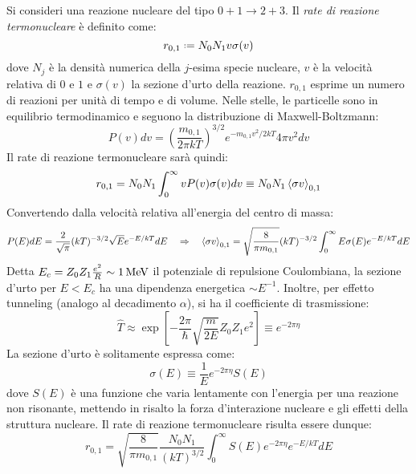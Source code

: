 Si consideri una reazione nucleare del tipo $ 0 + 1 \rightarrow 2 + 3 $. Il \textit{rate di reazione termonucleare} è definito come:
\begin{equation}
	r_{0,1} \defeq N_0 N_1 v \sigma(v)
	\label{eq:13.1}
\end{equation}
dove $ N_j $ è la densità numerica della $ j $-esima specie nucleare, $ v $ è la velocità relativa di $ 0 $ e $ 1 $ e $ \sigma(v) $ la sezione d'urto della reazione. $ r_{0,1} $ esprime un numero di reazioni per unità di tempo e di volume. Nelle stelle, le particelle sono in equilibrio termodinamico e seguono la distribuzione di Maxwell-Boltzmann:
\begin{equation}
	P(v) dv = \left( \frac{m_{0,1}}{2\pi k T} \right)^{3/2} e^{-m_{0,1} v^2 / 2kT} 4\pi v^2 dv
	\label{eq:13.2}
\end{equation}
Il rate di reazione termonucleare sarà quindi:
\begin{equation}
	r_{0,1} = N_0 N_1 \int_0^\infty v P(v) \sigma(v) dv \equiv N_0 N_1 \braket{\sigma v}_{0,1}
	\label{eq:13.3}
\end{equation}
Convertendo dalla velocità relativa all'energia del centro di massa:
\begin{equation*}
	P(E) dE = \frac{2}{\sqrt{\pi}} (kT)^{-3/2} \sqrt{E} e^{-E / kT} dE
	\quad \Rightarrow \quad
	\braket{\sigma v}_{0,1} = \sqrt{\frac{8}{\pi m_{0,1}}} (kT)^{-3/2} \int_0^\infty E \sigma(E) e^{-E / kT} dE
\end{equation*}
Detta $ E_c = Z_0 Z_1 \frac{e^2}{R} \sim 1 \,\mathrm{MeV} $ il potenziale di repulsione Coulombiana, la sezione d'urto per $ E < E_c $ ha una dipendenza energetica $ \sim E^{-1} $. Inoltre, per effetto tunneling (analogo al decadimento $ \alpha $), si ha il coefficiente di trasmissione:
\begin{equation}
	\hat{T} \approx \exp \left[ - \frac{2\pi}{\hbar} \sqrt{\frac{m}{2E}} Z_0 Z_1 e^2 \right] \equiv e^{-2\pi \eta}
	\label{eq:13.4}
\end{equation}
La sezione d'urto è solitamente espressa come:
\begin{equation}
	\sigma(E) \equiv \frac{1}{E} e^{-2\pi \eta} S(E)
	\label{eq:13.5}
\end{equation}
dove $ S(E) $ è una funzione che varia lentamente con l'energia per una reazione non risonante, mettendo in risalto la forza d'interazione nucleare e gli effetti della struttura nucleare. Il rate di reazione termonucleare risulta essere dunque:
\begin{equation}
	r_{0,1} = \sqrt{\frac{8}{\pi m_{0,1}}} \frac{N_0 N_1}{(kT)^{3/2}} \int_0^\infty S(E) e^{-2\pi \eta} e^{-E/kT} dE
	\label{eq:13.6}
\end{equation}

